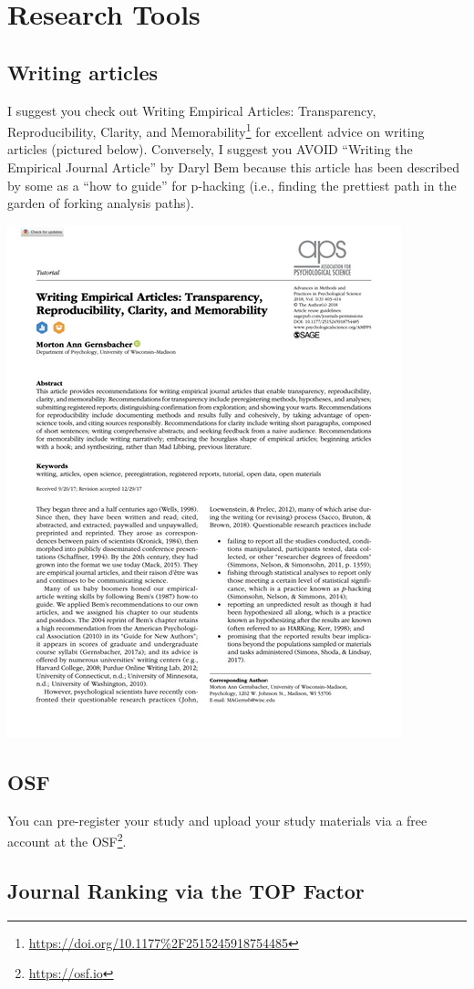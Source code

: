 \documentclass[
]{krantz}
\renewcommand{\href}[2]{#2\footnote{\url{#1}}}
\begin{document}
\hypertarget{research-tools}{%
\chapter{Research Tools}\label{research-tools}}

\hypertarget{writing-articles}{%
\section{Writing articles}\label{writing-articles}}

I suggest you check out \href{https://doi.org/10.1177\%2F2515245918754485}{Writing Empirical Articles: Transparency, Reproducibility, Clarity, and Memorability} for excellent advice on writing articles (pictured below). Conversely, I suggest you AVOID ``Writing the Empirical Journal Article'' by Daryl Bem because this article has been described by some as a ``how to guide'' for p-hacking (i.e., finding the prettiest path in the garden of forking analysis paths).

\includegraphics[width=0.5\linewidth]{images/gernsbacher}

\hypertarget{osf}{%
\section{OSF}\label{osf}}

You can pre-register your study and upload your study materials via a free account at the \href{https://osf.io}{OSF}.

\hypertarget{journal-ranking-via-the-top-factor}{%
\section{Journal Ranking via the TOP Factor}\label{journal-ranking-via-the-top-factor}}
\end{document}
